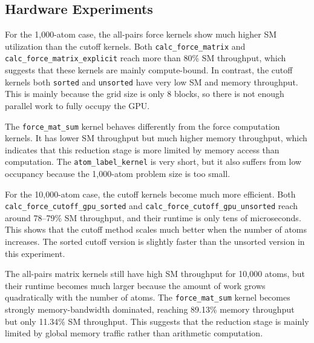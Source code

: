 \documentclass[12pt]{article}
\begin{document}
\subsection{Hardware Experiments}
For the 1,000-atom case, the all-pairs force kernels show much higher SM utilization than the cutoff kernels. Both \texttt{calc\_force\_matrix} and \texttt{calc\_force\_matrix\_explicit} reach more than 80\% SM throughput, which suggests that these kernels are mainly compute-bound. In contrast, the cutoff kernels both \texttt{sorted} and \texttt{unsorted} have very low SM and memory throughput. This is mainly because the grid size is only 8 blocks, so there is not enough parallel work to fully occupy the GPU.

The \texttt{force\_mat\_sum} kernel behaves differently from the force computation kernels. It has lower SM throughput but much higher memory throughput, which indicates that this reduction stage is more limited by memory access than computation. The \texttt{atom\_label\_kernel} is very short, but it also suffers from low occupancy because the 1,000-atom problem size is too small.

For the 10,000-atom case, the cutoff kernels become much more efficient. Both \texttt{calc\_force\_cutoff\_gpu\_sorted} and \texttt{calc\_force\_cutoff\_gpu\_unsorted} reach around 78--79\% SM throughput, and their runtime is only tens of microseconds. This shows that the cutoff method scales much better when the number of atoms increases. The sorted cutoff version is slightly faster than the unsorted version in this experiment.

The all-pairs matrix kernels still have high SM throughput for 10,000 atoms, but their runtime becomes much larger because the amount of work grows quadratically with the number of atoms. The \texttt{force\_mat\_sum} kernel becomes strongly memory-bandwidth dominated, reaching 89.13\% memory throughput but only 11.34\% SM throughput. This suggests that the reduction stage is mainly limited by global memory traffic rather than arithmetic computation.
\end{document}

